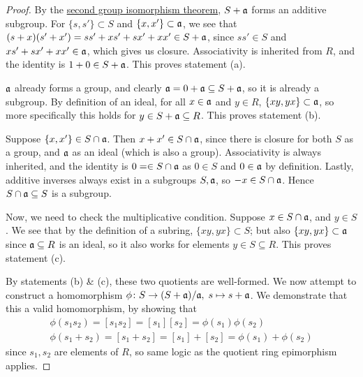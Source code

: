 \begin{proof}
    By the \hyperref[thm:iso-2-group]{second group isomorphism theorem},
    \(S+\mathfrak{a}\) forms an additive subgroup.
    For \(\{s,s'\} \subset S\) and \(\{x,x'\} \subset \mathfrak{a}\),
    we see that \((s+x)(s'+x') = ss' + xs' + sx' + xx' \in S+\mathfrak{a}\),
    since \(ss' \in S\) and \(xs' + sx' + xx' \in \mathfrak{a}\),
    which gives us closure.
    Associativity is inherited from \(R\),
    and the identity is \(1+0 \in S+\mathfrak{a}\).
    This proves statement (a).

    \medskip

    \(\mathfrak{a}\) already forms a group,
    and clearly \(\mathfrak{a} = 0+\mathfrak{a} \subseteq S+\mathfrak{a}\),
    so it is already a subgroup.
    By definition of an ideal,
    for all \(x \in \mathfrak{a}\) and \(y \in R\), \(\{xy,yx\} \subset \mathfrak{a}\),
    so more specifically this holds for \(y \in S+\mathfrak{a} \subseteq R\).
    This proves statement (b).

    \medskip

    Suppose \(\{x,x'\} \in S \cap \mathfrak{a}\).
    Then \(x+x' \in S \cap \mathfrak{a}\),
    since there is closure for both \(S\) as a group,
    and \(\mathfrak{a}\) as an ideal (which is also a group).
    Associativity is always inherited,
    and the identity is \(0 = \in S \cap \mathfrak{a}\)
    as \(0 \in S\) and \(0 \in \mathfrak{a}\) by definition.
    Lastly, additive inverses always exist in a subgroups \(S,\mathfrak{a}\),
    so \(-x \in S \cap \mathfrak{a}\).
    Hence \(S \cap \mathfrak{a} \subseteq S\) is a subgroup.

    Now, we need to check the multiplicative condition.
    Suppose \(x \in S \cap \mathfrak{a}\), and \(y \in S\).
    We see that by the definition of a subring, \(\{xy,yx\} \subset S\);
    but also \(\{xy,yx\} \subset \mathfrak{a}\) since \(\mathfrak{a} \subseteq R\) is an ideal,
    so it also works for elements \(y \in S \subseteq R\).
    This proves statement (c).

    \medskip

    By statements (b) \& (c), these two quotients are well-formed.
    We now attempt to construct a homomorphism
    \(\phi\colon S\to(S+\mathfrak{a})/\mathfrak{a},\;s\mapsto s+\mathfrak{a}\).
    We demonstrate that this a valid homomorphism,
    by showing that
    \begin{gather*}
        \phi(s_1 s_2) = [s_1 s_2] = [s_1][s_2] = \phi(s_1)\phi(s_2) \\
        \phi(s_1+s_2) = [s_1+s_2] = [s_1] + [s_2] = \phi(s_1) + \phi(s_2)
    \end{gather*}
    since \(s_1, s_2\) are elements of \(R\),
    so same logic as the quotient ring epimorphism applies.


\end{proof}
